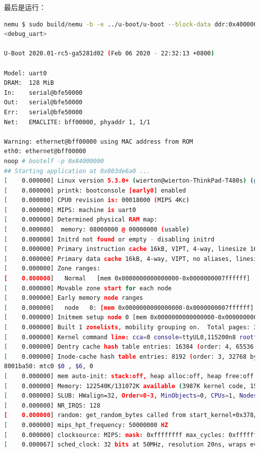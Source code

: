 \documentclass[lang=cn,11pt,a4paper]{elegantpaper}
\begin{document}
最后是运行：
\begin{lstlisting}[language=bash]
nemu $ sudo build/nemu -b -e ../u-boot/u-boot --block-data ddr:0x4000000:../linux/vmlinux
<debug_uart>

U-Boot 2020.01-rc5-ga5281d02 (Feb 06 2020 - 22:32:13 +0800)

Model: uart0
DRAM:  128 MiB
In:    serial@bfe50000
Out:   serial@bfe50000
Err:   serial@bfe50000
Net:   EMACLITE: bff00000, phyaddr 1, 1/1

Warning: ethernet@bff00000 using MAC address from ROM
eth0: ethernet@bff00000
noop # bootelf -p 0x84000000
## Starting application at 0x803de6a0 ...
[    0.000000] Linux version 5.3.0+ (wierton@wierton-ThinkPad-T480s) (gcc version 7.4.0 (Ubuntu 7.4.0-1ubuntu1~18.04.1)) #1 Thu Feb 6 22:32:34 CST 2020
[    0.000000] printk: bootconsole [early0] enabled
[    0.000000] CPU0 revision is: 00018000 (MIPS 4Kc)
[    0.000000] MIPS: machine is uart0
[    0.000000] Determined physical RAM map:
[    0.000000]  memory: 08000000 @ 00000000 (usable)
[    0.000000] Initrd not found or empty - disabling initrd
[    0.000000] Primary instruction cache 16kB, VIPT, 4-way, linesize 16 bytes.
[    0.000000] Primary data cache 16kB, 4-way, VIPT, no aliases, linesize 16 bytes
[    0.000000] Zone ranges:
[    0.000000]   Normal   [mem 0x0000000000000000-0x0000000007ffffff]
[    0.000000] Movable zone start for each node
[    0.000000] Early memory node ranges
[    0.000000]   node   0: [mem 0x0000000000000000-0x0000000007ffffff]
[    0.000000] Initmem setup node 0 [mem 0x0000000000000000-0x0000000007ffffff]
[    0.000000] Built 1 zonelists, mobility grouping on.  Total pages: 32512
[    0.000000] Kernel command line: cca=0 console=ttyUL0,115200n8 rootfstype=ext4 root=/dev/mtdblock0
[    0.000000] Dentry cache hash table entries: 16384 (order: 4, 65536 bytes, linear)
[    0.000000] Inode-cache hash table entries: 8192 (order: 3, 32768 bytes, linear)
8001ba50: mtc0 $0 , $6, 0
[    0.000000] mem auto-init: stack:off, heap alloc:off, heap free:off
[    0.000000] Memory: 122540K/131072K available (3987K kernel code, 154K rwdata, 748K rodata, 2144K init, 325K bss, 8532K reserved, 0K cma-reserved)
[    0.000000] SLUB: HWalign=32, Order=0-3, MinObjects=0, CPUs=1, Nodes=1
[    0.000000] NR_IRQS: 128
[    0.000000] random: get_random_bytes called from start_kernel+0x378/0x570 with crng_init=0
[    0.000000] mips_hpt_frequency: 50000000 HZ
[    0.000000] clocksource: MIPS: mask: 0xffffffff max_cycles: 0xffffffff, max_idle_ns: 38225208935 ns
[    0.000067] sched_clock: 32 bits at 50MHz, resolution 20ns, wraps every 42949672950ns

\end{lstlisting}
\end{document}
